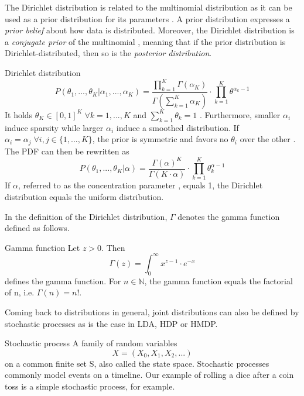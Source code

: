 The Dirichlet distribution is related to the multinomial distribution as it can be used as a prior distribution for its parameters \cite{DBLP:phd/dnb/Kling16}. A prior distribution expresses a \textit{prior belief} about how data is distributed. Moreover, the Dirichlet distribution is a \textit{conjugate prior} of the multinomial \cite{DBLP:journals/jmlr/BleiNJ03}, meaning that if the prior distribution is Dirichlet-distributed, then so is the \textit{posterior distribution}.
\begin{definition}{Dirichlet distribution}
\begin{equation}
P(\theta_1,...,\theta_K|\alpha_1,...,\alpha_K) = \frac{\prod_{k=1}^K\Gamma(\alpha_K)}
{\Gamma(\sum_{k=1}^K\alpha_K)}\cdot \prod_{k=1}^K\theta^{\alpha_{k}-1}
\end{equation}
It holds $\theta_K \in [0,1]^K \; \forall k=1,...,K$ and $\sum_{k=1}^K \theta_k = 1$ \cite{DBLP:phd/dnb/Kling16}. Furthermore, smaller $\alpha_i$ induce sparsity while larger $\alpha_i$ induce a smoothed distribution. If $\alpha_i = \alpha_j \; \forall i,j \in \{1,...,K\}$, the prior is symmetric and favors no $\theta_i$ over the other \cite{DBLP:phd/dnb/Kling16}. The PDF can then be rewritten as
\begin{equation}
P(\theta_1,...,\theta_K|\alpha) = \frac{\Gamma(\alpha)^K}{\Gamma(K\cdot\alpha)} \cdot
\prod_{k=1}^K \theta_k^{\alpha-1}
\end{equation}
If $\alpha$, referred to as the concentration parameter \cite{DBLP:phd/dnb/Kling16}, equals 1, the Dirichlet distribution equals the uniform distribution.
\end{definition}
In the definition of the Dirichlet distribution, $\Gamma$ denotes the gamma function defined as follows.
\begin{definition}{Gamma function}
Let $z > 0$. Then
\begin{equation}
\Gamma(z) = \int_0^{\infty}x^{z-1}\cdot e^{-x}
\end{equation}
defines the gamma function. For $n \in \mathbb{N}$, the gamma function equals the factorial of n, i.e. $\Gamma(n) = n!$.
\end{definition}
Coming back to distributions in general, joint distributions can also be defined by stochastic processes \cite{Blei:2012:PTM:2133806.2133826} as is the case in LDA, HDP or HMDP.
\begin{definition}{Stochastic process}
\label{sprocess}
A family of random variables
\begin{equation}
X = (X_0, X_1, X_2,...)
\end{equation}
on a common finite set S, also called the state space. Stochastic processes commonly model events on a timeline. Our example of rolling a dice after a coin toss is a simple stochastic process, for example.
\end{definition}
